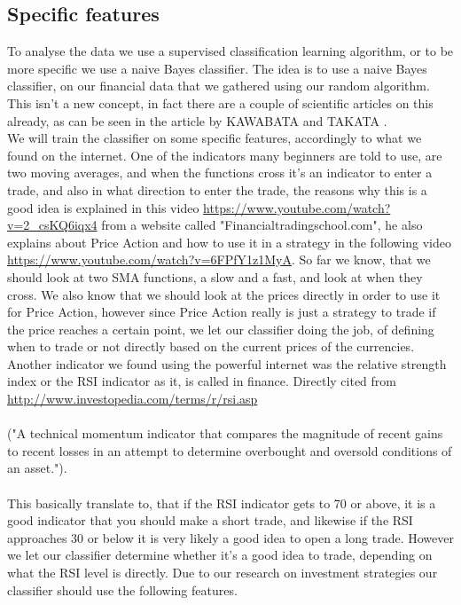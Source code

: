 \documentclass[10pt]{IEEEtran}
\begin{document}
\subsection{Specific features}
To analyse the data we use a supervised classification learning algorithm, or to be more specific we use a naive Bayes classifier. The idea is to use a naive Bayes classifier, on our financial data that we gathered using our random algorithm. This isn't a new concept, in fact there are a couple of scientific articles on this already, as can be seen in the article by KAWABATA and TAKATA \cite{fxNaiveBayes}.\\ 
We will train the classifier on some specific features, accordingly to what we found on the internet. One of the indicators many beginners are told to use, are two moving averages, and when the functions cross it's an indicator to enter a trade, and also in what direction to enter the trade, the reasons why this is a good idea is explained in this video \url{https://www.youtube.com/watch?v=2_csKQ6iqx4} from a website called "Financialtradingschool.com", he also explains about Price Action and how to use it in a strategy in the following video \url{https://www.youtube.com/watch?v=6FPfY1z1MyA}. So far we know, that we should look at two SMA functions, a slow and a fast, and look at when they cross. We also know that we should look at the prices directly in order to use it for Price Action, however since Price Action really is just a strategy to trade if the price reaches a certain point, we let our classifier doing the job, of defining when to trade or not directly based on the current prices of the currencies. Another indicator we found using the powerful internet was the relative strength index or the RSI indicator as it, is called in finance. Directly cited from \url{http://www.investopedia.com/terms/r/rsi.asp}\\
\\
("A technical momentum indicator that compares the magnitude of recent gains to recent losses in an attempt to determine overbought and oversold conditions of an asset.").\\ \\

This basically translate to, that if the RSI indicator gets to 70 or above, it is a good indicator that you should make a short trade, and likewise if the RSI approaches 30 or below it is very likely a good idea to open a long trade. However we let our classifier determine whether it's a good idea to trade, depending on what the RSI level is directly. 
Due to our research on investment strategies our classifier should use the following features.
\end{document}
